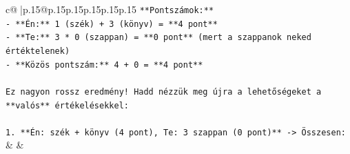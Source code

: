 \documentclass{article}
\begin{document}
{\begin{supertabular}{c@{$\;$}|p{.15\linewidth}@{}p{.15\linewidth}p{.15\linewidth}p{.15\linewidth}p{.15\linewidth}p{.15\linewidth}}
{{{\texttt{**Pontszámok:**} \\
\texttt{{-} **Én:** 1 (szék) + 3 (könyv) = **4 pont**} \\
\texttt{{-} **Te:** 3 * 0 (szappan) = **0 pont** (mert a szappanok neked értéktelenek)} \\
\texttt{{-} **Közös pontszám:** 4 + 0 = **4 pont**} \\
\\ 
\texttt{Ez nagyon rossz eredmény! Hadd nézzük meg újra a lehetőségeket a **valós** értékelésekkel:} \\
\\ 
\texttt{1.  **Én: szék + könyv (4 pont), Te: 3 szappan (0 pont)** {-}> Összesen:} \\
            }
        }
    }
    & & \\ \\


\end{supertabular}}
\end{document}

